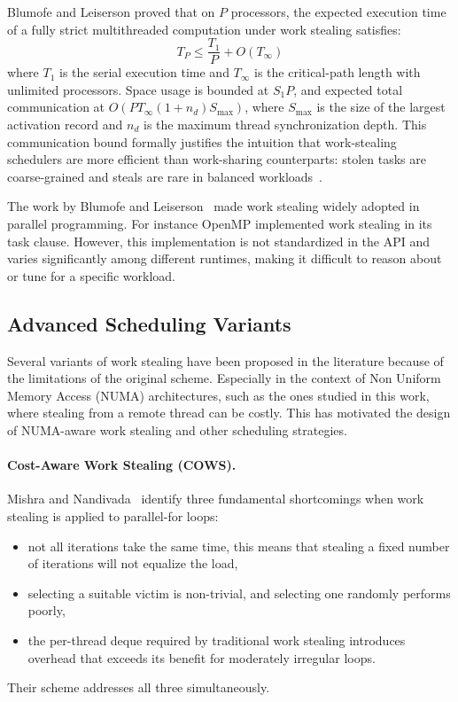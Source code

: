 \documentclass[11pt,english]{article}
\begin{document}
    Blumofe and Leiserson proved that on $P$ processors, the expected execution time of a fully strict multithreaded computation under work stealing satisfies:
    \[
        T_P \leq \frac{T_1}{P} + O(T_\infty)
    \]
    where $T_1$ is the serial execution time and $T_\infty$ is the critical-path length with unlimited processors. Space usage is bounded at $S_1 P$, and expected total communication at $O(PT_\infty(1 + n_d)S_{\max})$, where $S_{\max}$ is the size of the largest activation record and $n_d$ is the maximum thread synchronization depth. This communication bound formally justifies the intuition that work-stealing schedulers are more efficient than work-sharing counterparts: stolen tasks are coarse-grained and steals are rare in balanced workloads~\cite{blumofe1999workstealing}.

    The work by Blumofe and Leiserson~\cite{blumofe1999workstealing} made work stealing widely adopted in parallel programming. For instance OpenMP implemented work stealing in its task clause. However, this implementation is not standardized in the API and varies significantly among different runtimes, making it difficult to reason about or tune for a specific workload.

    \subsection{Advanced Scheduling Variants}
    Several variants of work stealing have been proposed in the literature because of the limitations of the original scheme. Especially in the context of Non Uniform Memory Access (NUMA) architectures, such as the ones studied in this work, where stealing from a remote thread can be costly. This has motivated the design of NUMA-aware work stealing and other scheduling strategies.

    \paragraph{Cost-Aware Work Stealing (COWS).}
    Mishra and Nandivada~\cite{mishra2024cows} identify three fundamental shortcomings when work stealing is applied to parallel-for loops:  
    \begin{itemize}
        \item not all iterations take the same time, this means that stealing a fixed number of iterations will not equalize the load,
        \item selecting a suitable victim is non-trivial, and selecting one randomly performs poorly,
        \item the per-thread deque required by traditional work stealing introduces overhead that exceeds its benefit for moderately irregular loops.
    \end{itemize}
    Their scheme addresses all three simultaneously.
\end{document}
